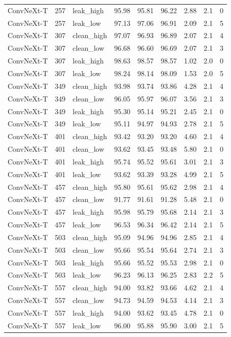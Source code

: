 {\begin{longtable}{lrlrrrrrr}
ConvNeXt-T & 257 & leak\_high & 95.98 & 95.81 & 96.22 & 2.88 & 2.1 & 0 \\
ConvNeXt-T & 257 & leak\_low & 97.13 & 97.06 & 96.91 & 2.09 & 2.1 & 5 \\
ConvNeXt-T & 307 & clean\_high & 97.07 & 96.93 & 96.89 & 2.07 & 2.1 & 4 \\
ConvNeXt-T & 307 & clean\_low & 96.68 & 96.60 & 96.69 & 2.07 & 2.1 & 3 \\
ConvNeXt-T & 307 & leak\_high & 98.63 & 98.57 & 98.57 & 1.02 & 2.0 & 0 \\
ConvNeXt-T & 307 & leak\_low & 98.24 & 98.14 & 98.09 & 1.53 & 2.0 & 5 \\
ConvNeXt-T & 349 & clean\_high & 93.98 & 93.74 & 93.86 & 4.28 & 2.1 & 4 \\
ConvNeXt-T & 349 & clean\_low & 96.05 & 95.97 & 96.07 & 3.56 & 2.1 & 3 \\
ConvNeXt-T & 349 & leak\_high & 95.30 & 95.14 & 95.21 & 2.45 & 2.1 & 0 \\
ConvNeXt-T & 349 & leak\_low & 95.11 & 94.97 & 94.93 & 2.78 & 2.1 & 5 \\
ConvNeXt-T & 401 & clean\_high & 93.42 & 93.20 & 93.20 & 4.60 & 2.1 & 4 \\
ConvNeXt-T & 401 & clean\_low & 93.62 & 93.45 & 93.48 & 5.80 & 2.1 & 0 \\
ConvNeXt-T & 401 & leak\_high & 95.74 & 95.52 & 95.61 & 3.01 & 2.1 & 3 \\
ConvNeXt-T & 401 & leak\_low & 93.62 & 93.39 & 93.28 & 4.99 & 2.1 & 5 \\
ConvNeXt-T & 457 & clean\_high & 95.80 & 95.61 & 95.62 & 2.98 & 2.1 & 4 \\
ConvNeXt-T & 457 & clean\_low & 91.77 & 91.61 & 91.28 & 5.48 & 2.1 & 0 \\
ConvNeXt-T & 457 & leak\_high & 95.98 & 95.79 & 95.68 & 2.14 & 2.1 & 3 \\
ConvNeXt-T & 457 & leak\_low & 96.53 & 96.34 & 96.42 & 2.14 & 2.1 & 5 \\
ConvNeXt-T & 503 & clean\_high & 95.09 & 94.96 & 94.96 & 2.85 & 2.1 & 4 \\
ConvNeXt-T & 503 & clean\_low & 95.66 & 95.54 & 95.64 & 2.74 & 2.1 & 3 \\
ConvNeXt-T & 503 & leak\_high & 95.66 & 95.52 & 95.53 & 2.98 & 2.1 & 0 \\
ConvNeXt-T & 503 & leak\_low & 96.23 & 96.13 & 96.25 & 2.83 & 2.2 & 5 \\
ConvNeXt-T & 557 & clean\_high & 94.00 & 93.82 & 93.66 & 4.62 & 2.1 & 4 \\
ConvNeXt-T & 557 & clean\_low & 94.73 & 94.59 & 94.53 & 4.14 & 2.1 & 3 \\
ConvNeXt-T & 557 & leak\_high & 94.00 & 93.62 & 93.45 & 4.78 & 2.1 & 0 \\
ConvNeXt-T & 557 & leak\_low & 96.00 & 95.88 & 95.90 & 3.00 & 2.1 & 5 \\
\end{longtable}
}
